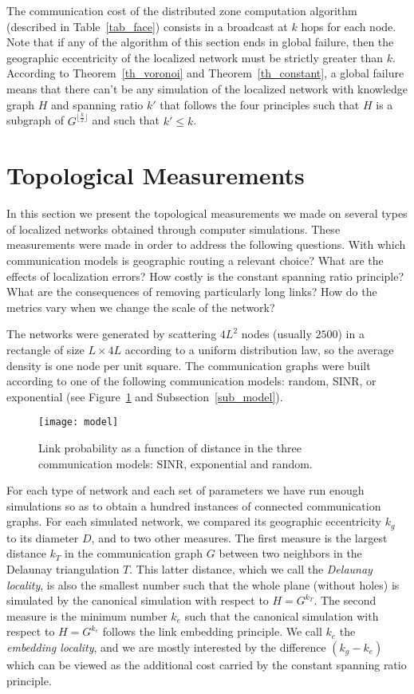 \documentclass{article}
\begin{document}
The communication cost of the distributed zone computation algorithm (described in Table~\ref{tab_face}) consists in a broadcast at $k$ hops for each node. Note that if any of the algorithm of this section ends in global failure, then the geographic eccentricity of the localized network must be strictly greater than $k$. According to Theorem~\ref{th_voronoi} and Theorem~\ref{th_constant}, a global failure means that there can't be any simulation of the localized network with knowledge graph $H$ and spanning ratio $k'$ that follows the four principles such that $H$ is a subgraph of $G^{\lfloor\frac{k}{2}\rfloor}$ and such that $k'\leq k$.

\section{Topological Measurements}
\label{sec_experiment}
In this section we present the topological measurements we made on several types of localized networks obtained through computer simulations.
These measurements were made in order to address the following questions.
With which communication models is geographic routing a relevant choice?
What are the effects of localization errors?
How costly is the constant spanning ratio principle? What are the consequences of removing particularly long links?
How do the metrics vary when we change the scale of the network?

The networks were generated by scattering $4L^2$ nodes (usually $2500$) in a rectangle of size $L\times 4L$ according to a uniform distribution law, so the average density is one node per unit square. The communication graphs were built according to one of the following communication models: random, SINR, or exponential (see Figure~\ref{fig_model} and Subsection~\ref{sub_model}).
\begin{figure}[h]
\begin{center}
\texttt{[image: model]}
\caption{Link probability as a function of distance in the three communication models: SINR, exponential and random.}
\label{fig_model}
\end{center}
\end{figure}

For each type of network and each set of parameters we have run enough simulations so as to obtain a hundred instances of connected communication graphs. For each simulated network, we compared its geographic eccentricity $k_g$ to its diameter $D$, and to two other measures. The first measure is the largest distance $k_T$ in the communication graph $G$ between two neighbors in the Delaunay triangulation $T$. This latter distance, which we call the {\em Delaunay locality}, is also the smallest number such that the whole plane (without holes) is simulated by the canonical simulation with respect to $H=G^{k_T}$. The second measure is the minimum number $k_e$ such that the canonical simulation with respect to $H=G^{k_e}$ follows the link embedding principle. We call $k_e$ the {\em embedding locality}, and we are mostly interested by the difference $(k_g-k_e)$ which can be viewed as the additional cost carried by the constant spanning ratio principle. 
\end{document}
